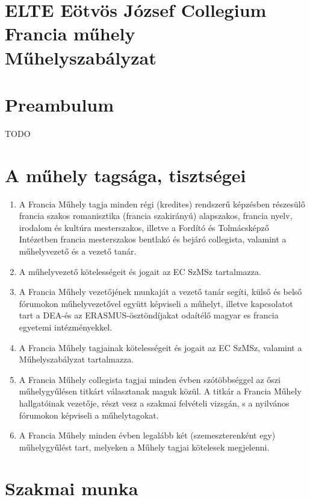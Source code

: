 \documentclass{rulebook}
\begin{document}
\section*{ELTE Eötvös József Collegium \\ Francia műhely\\ \vspace{0.5em} Műhelyszabályzat} 

\vspace{2em}

\section*{Preambulum}
TODO


\section{A műhely tagsága, tisztségei}

\begin{enumerate}
	\item A Francia Műhely tagja minden régi (kredites) rendszerű képzésben részesülő francia szakos romanisztika (francia szakirányú) alapszakos, francia nyelv, irodalom és kultúra mesterszakos, illetve a Fordító és Tolmácsképző Intézetben francia mesterszakos bentlakó és bejáró collegista, valamint a műhelyvezető és a vezető tanár.
	\item A műhelyvezető kötelességeit és jogait az EC SzMSz tartalmazza.
	\item A Francia Műhely vezetőjének munkaját a vezető tanár segíti, külső és belső fórumokon műhelyvezetővel együtt képviseli a műhelyt, illetve kapcsolatot tart a DEA-és az ERASMUS-ösztöndíjakat odaítélő magyar es francia egyetemi intézményekkel.
	\item A Francia Műhely tagjainak kötelességeit és jogait az EC SzMSz, valamint a Műhelyszabályzat tartalmazza.
	\item A Francia Műhely collegista tagjai minden évben szótöbbséggel az őszi műhelygyűlésen titkárt választanak maguk közül. A titkár a Francia Műhely hallgatóinak vezetője, részt vesz a szakmai felvételi vizsgán, s a nyilvános fórumokon képviseli a műhelytagokat.
	\item A Francia Műhely minden évben legalább két (szemeszterenként egy) műhelygyűlést tart, melyeken a Műhely tagjai kötelesek megjelenni.
\end{enumerate}


\section{Szakmai munka}
\end{document}
